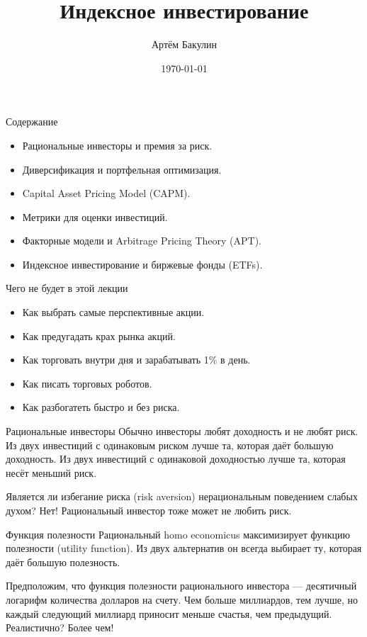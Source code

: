 \documentclass{beamer}
\title{Индексное инвестирование}
\author{Артём Бакулин}
\date{\today}
\begin{document}
\begin{frame}
\titlepage
\end{frame}



\begin{frame}{Содержание}
\justifying

\begin{itemize}
\justifying
\item Рациональные инвесторы и премия за риск.
\item Диверсификация и портфельная оптимизация.
\item Capital Asset Pricing Model (CAPM).
\item Метрики для оценки инвестиций.
\item Факторные модели и Arbitrage Pricing Theory (APT).
\item Индексное инвестирование и биржевые фонды (ETFs).
\end{itemize}
\end{frame}



\begin{frame}{Чего не будет в этой лекции}
\begin{itemize}
\justifying
\item Как выбрать самые перспективные акции.
\item Как предугадать крах рынка акций.
\item Как торговать внутри дня и зарабатывать 1\% в день.
\item Как писать торговых роботов.
\item Как разбогатеть быстро и без риска.
\end{itemize}
\end{frame}



\begin{frame}{Рациональные инвесторы}
\justify
Обычно инвесторы любят доходность и не любят риск. Из двух
инвестиций с одинаковым риском лучше та, которая даёт большую доходность. Из двух инвестиций с одинаковой доходностью лучше та, которая несёт меньший риск.

\vspace{\baselineskip}
Является ли избегание риска (risk aversion) нерациональным поведением слабых духом? Нет! Рациональный инвестор тоже может не любить риск.
\end{frame}



\begin{frame}{Функция полезности}
\justify
Рациональный homo economicus максимизирует функцию полезности (utility function). Из двух альтернатив он всегда выбирает ту, которая даёт большую полезность.

\vspace{\baselineskip}
Предположим, что функция полезности рационального инвестора --- десятичный логарифм количества долларов на счету. Чем больше миллиардов, тем лучше, но каждый следующий миллиард приносит меньше счастья, чем предыдущий. Реалистично? Более чем!
\end{frame}
\end{document}
